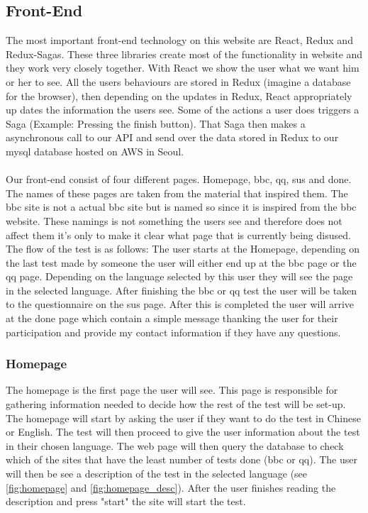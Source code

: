 \subsection{Front-End}
The most important front-end technology on this website are React, Redux and Redux-Sagas. These three libraries create most of the functionality in website and they work very closely together. With React we show the user what we want him or her to see. All the users behaviours are stored in Redux (imagine a database for the browser), then depending on the updates in Redux, React appropriately up dates the information the users see. Some of the actions a user does triggers a Saga (Example: Pressing the finish button). That Saga then makes a asynchronous call to our API and send over the data stored in Redux to our mysql database hosted on AWS in Seoul. 
\\\\
Our front-end consist of four different pages. Homepage, bbc, qq, sus and done. The names of these pages are taken from the material that inspired them. The bbc site is not a actual bbc site but is named so since it is inspired from the bbc website. These namings is not something the users see and therefore does not affect them it's only to make it clear what page that is currently being disused. The flow of the test is as follows: The user starts at the Homepage, depending on the last test made by someone the user will either end up at the bbc page or the qq page. Depending on the language selected by this user they will see the page in the selected language. After finishing the bbc or qq test the user will be taken to the questionnaire on the sus page. After this is completed the user will arrive at the done page which contain a simple message thanking the user for their participation and provide my contact information if they have any questions. 

\subsubsection{Homepage}
The homepage is the first page the user will see. This page is responsible for gathering information needed to decide how the rest of the test will be set-up. The homepage will start by asking the user if they want to do the test in Chinese or English. The test will then proceed to give the user information about the test in their chosen language. The web page will then query the database to check which of the sites that have the least number of tests done (bbc or qq). The user will then be see a description of the test in the selected language (see \ref{fig:homepage} and \ref{fig:homepage_desc}). After the user finishes reading the description and press "start" the site will start the test.


